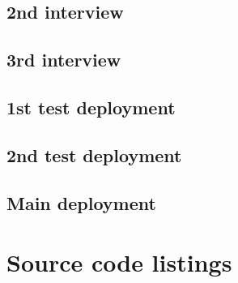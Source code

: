 \documentclass[numbers=endperiod, parskip=half-]{scrreprt}
\begin{document}
\section{2nd interview}\label{second-interview}

\section{3rd interview}\label{third-interview}

\section{1st test deployment}\label{first-test}

\section{2nd test deployment}\lae

\section{Main deployment}


\chapter{Source code listings}


\end{document}
